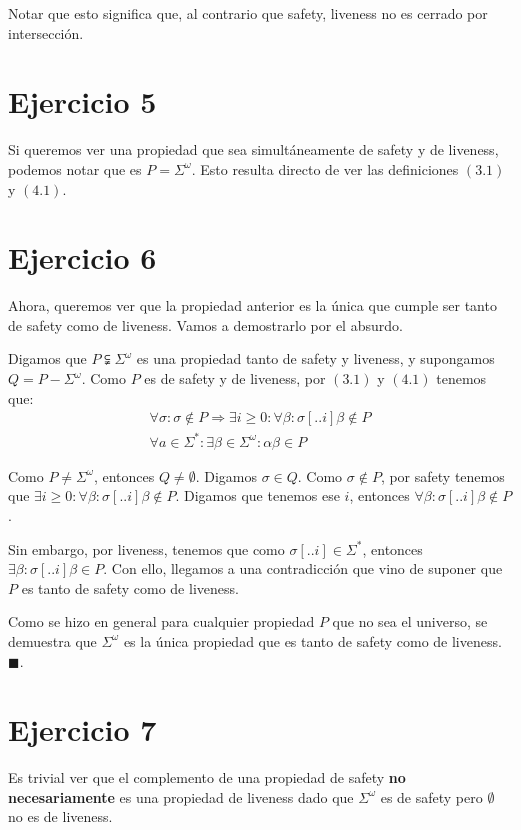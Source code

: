 \documentclass{article}
\begin{document}
Notar que esto significa que, al contrario que safety, liveness no es cerrado por intersección.

\section*{Ejercicio 5}
Si queremos ver una propiedad que sea simultáneamente de safety y de liveness, podemos notar que es $P = \Sigma^\omega$.
Esto resulta directo de ver las definiciones $(3.1)$ y $(4.1)$.

\section*{Ejercicio 6}
Ahora, queremos ver que la propiedad anterior es la única que cumple ser tanto de safety como de liveness. Vamos a demostrarlo por el absurdo.

Digamos que $P \subsetneqq \Sigma^\omega$ es una propiedad tanto de safety y liveness, y supongamos $Q = P - \Sigma^\omega$.
Como $P$ es de safety y de liveness, por $(3.1)$ y $(4.1)$ tenemos que:
\begin{equation}
	\begin{aligned}
		\forall \sigma : \sigma \notin P \Rightarrow \exists i \geq 0 : \forall \beta : \sigma[..i]\beta \notin P \\
		\forall a \in \Sigma^* : \exists \beta \in \Sigma^\omega : \alpha\beta \in P
	\end{aligned}
\end{equation}

Como $P \neq \Sigma^\omega$, entonces $Q \neq \emptyset$.
Digamos $\sigma \in Q$.
Como $\sigma \notin P$, por safety tenemos que $\exists i \geq 0 : \forall \beta : \sigma[..i]\beta \notin P$.
Digamos que tenemos ese $i$, entonces $\forall \beta : \sigma[..i]\beta \notin P$.

Sin embargo, por liveness, tenemos que como $\sigma[..i] \in \Sigma^*$, entonces $\exists \beta : \sigma[..i]\beta \in P$.
Con ello, llegamos a una contradicción que vino de suponer que $P$ es tanto de safety como de liveness.

Como se hizo en general para cualquier propiedad $P$ que no sea el universo, se demuestra que $\Sigma^\omega$ es la única propiedad que es tanto de safety como de liveness. $\blacksquare$.

\section*{Ejercicio 7}
Es trivial ver que el complemento de una propiedad de safety \textbf{no necesariamente} es una propiedad de liveness dado que $\Sigma^\omega$ es de safety pero $\emptyset$ no es de liveness.
\end{document}

